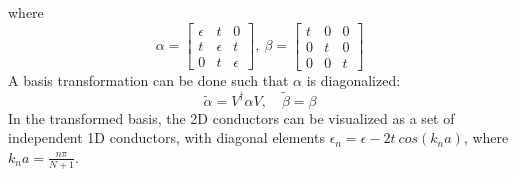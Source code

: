 \documentclass{beamer}
\begin{document}
{\begin{frame}
\begin{figure}[!htbp]
\begin{subfigure}{0.15\textwidth}
   \end{subfigure}
\end{figure}
         
where 
\begin{equation*}
    \alpha = \begin{bmatrix}
             \epsilon & t & 0 \\
             t & \epsilon & t \\
             0 & t & \epsilon 
             \end{bmatrix}, \
    \beta = \begin{bmatrix}
            t & 0 & 0 \\
            0 & t & 0 \\
            0 & 0 & t
            \end{bmatrix}
\end{equation*}
A basis transformation can be done such that $\alpha$ is diagonalized: 
\begin{equation*}
    \tilde{\alpha} = V^{\dagger}\alpha V, \quad \tilde{\beta} = \beta
\end{equation*}
In the transformed basis, the 2D conductors can be visualized as a set of independent 1D conductors, with diagonal elements $\epsilon_{n} = \epsilon-2t\ cos(k_{n}a)$, where $k_{n}a = \frac{n\pi}{N+1}$.

    \end{frame} 
}
\end{document}
